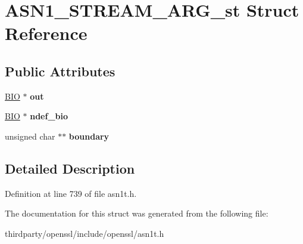 \hypertarget{struct_a_s_n1___s_t_r_e_a_m___a_r_g__st}{}\section{A\+S\+N1\+\_\+\+S\+T\+R\+E\+A\+M\+\_\+\+A\+R\+G\+\_\+st Struct Reference}
\label{struct_a_s_n1___s_t_r_e_a_m___a_r_g__st}
\subsection*{Public Attributes}
\begin{DoxyCompactItemize}
\item 
\mbox{\label{struct_a_s_n1___s_t_r_e_a_m___a_r_g__st_ac35c1f4f1baf2ecf2e38d6586fe313d1}} 
\hyperlink{structbio__st}{B\+IO} $\ast$ {\bfseries out}
\item 
\mbox{\label{struct_a_s_n1___s_t_r_e_a_m___a_r_g__st_a3008dd662b50834af241f3f674578e8a}} 
\hyperlink{structbio__st}{B\+IO} $\ast$ {\bfseries ndef\+\_\+bio}
\item 
\mbox{\label{struct_a_s_n1___s_t_r_e_a_m___a_r_g__st_af36de93a0bc727a033a9db57238e4161}} 
unsigned char $\ast$$\ast$ {\bfseries boundary}
\end{DoxyCompactItemize}


\subsection{Detailed Description}


Definition at line 739 of file asn1t.\+h.



The documentation for this struct was generated from the following file\+:\begin{DoxyCompactItemize}
\item 
thirdparty/openssl/include/openssl/asn1t.\+h\end{DoxyCompactItemize}
